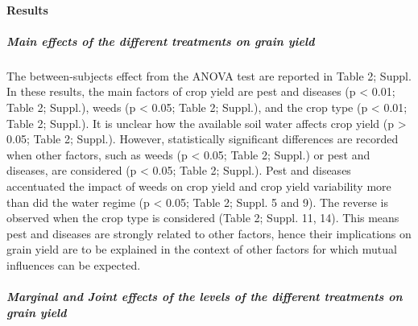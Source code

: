 \documentclass[11pt,preprint]{article}
\begin{document}
\hypertarget{results}{%
\paragraph{Results}\label{results}}

\hypertarget{main-effects-of-the-different-treatments-on-grain-yield}{%
\subparagraph{Main effects of the different treatments on grain
yield}\label{main-effects-of-the-different-treatments-on-grain-yield}}

The between-subjects effect from the ANOVA test are reported in Table 2;
Suppl. In these results, the main factors of crop yield are pest and
diseases (p \textless{} 0.01; Table 2; Suppl.), weeds (p \textless{}
0.05; Table 2; Suppl.), and the crop type (p \textless{} 0.01; Table 2;
Suppl.). It is unclear how the available soil water affects crop yield
(p \textgreater{} 0.05; Table 2; Suppl.). However, statistically
significant differences are recorded when other factors, such as weeds
(p \textless{} 0.05; Table 2; Suppl.) or pest and diseases, are
considered (p \textless{} 0.05; Table 2; Suppl.). Pest and diseases
accentuated the impact of weeds on crop yield and crop yield variability
more than did the water regime (p \textless{} 0.05; Table 2; Suppl. 5
and 9). The reverse is observed when the crop type is considered (Table
2; Suppl. 11, 14). This means pest and diseases are strongly related to
other factors, hence their implications on grain yield are to be
explained in the context of other factors for which mutual influences
can be expected.

\hypertarget{marginal-and-joint-effects-of-the-levels-of-the-different-treatments-on-grain-yield}{%
\subparagraph{Marginal and Joint effects of the levels of the different
treatments on grain
yield}\label{marginal-and-joint-effects-of-the-levels-of-the-different-treatments-on-grain-yield}}
\end{document}
